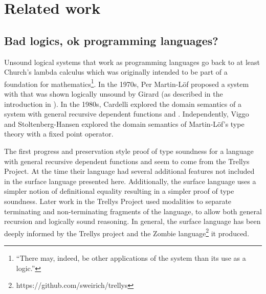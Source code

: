 \section{Related work}

\subsection{Bad logics, ok programming languages?}

Unsound logical systems that work as programming languages go back to at least Church's lambda calculus which was originally intended to be part of a foundation for mathematics\footnote{``There may, indeed, be other applications of the system than its use as a logic.''\cite[p.349]{10.2307/1968337}}.
In the 1970s, Per Martin-L{\"o}f proposed a system with \tit{} that was shown logically unsound by Girard (as described in the introduction in \cite{Martin-Lof-1972}).
In the 1980s, Cardelli explored the domain semantics of a system with general recursive dependent functions and \tit{}\cite{cardelli1986polymorphic}.
Independently, Viggo and Stoltenberg-Hansen\cite{PALMGREN1990135} explored the domain semantics of Martin-L{\"o}f's type theory with a fixed point operator.

The first progress and preservation style proof of type soundness for a language with general recursive dependent functions and \tit{} seem to come from the Trellys Project\cite{sjoberg2012irrelevance}.
At the time their language had several additional features not included in the surface language presented here.
Additionally, the surface language uses a simpler notion of definitional equality resulting in a simpler proof of type soundness.
Later work in the Trellys Project\cite{casinghino2014combining,casinghino2014combiningthesis} used modalities to separate terminating and non-terminating fragments of the language, to allow both general recursion and logically sound reasoning. %
In general, the surface language has been deeply informed by the Trellys project\cite{sjoberg2012irrelevance,casinghino2014combining,casinghino2014combiningthesis,sjoberg2015programming,sjoberg2015dependently} and the Zombie language\footnote{https://github.com/sweirich/trellys} it produced.


